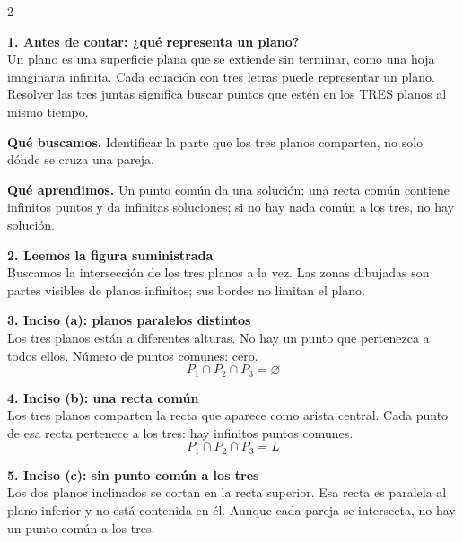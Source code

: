 \documentclass[11pt,a4paper,landscape]{article}
\begin{document}
\begin{multicols*}{2}
\noindent\begin{minipage}{\linewidth}\textbf{1. Antes de contar: ¿qué representa un plano?}\\[2pt]Un plano es una superficie plana que se extiende sin terminar, como una hoja imaginaria infinita. Cada ecuación con tres letras puede representar un plano. Resolver las tres juntas significa buscar puntos que estén en los TRES planos al mismo tiempo.
\par\smallskip\textbf{Qué buscamos.} Identificar la parte que los tres planos comparten, no solo dónde se cruza una pareja.
\par\smallskip\textbf{Qué aprendimos.} Un punto común da una solución; una recta común contiene infinitos puntos y da infinitas soluciones; si no hay nada común a los tres, no hay solución.
\end{minipage}\par\medskip
\noindent\begin{minipage}{\linewidth}\textbf{2. Leemos la figura suministrada}\\[2pt]Buscamos la intersección de los tres planos a la vez. Las zonas dibujadas son partes visibles de planos infinitos; sus bordes no limitan el plano.
\end{minipage}\par\medskip
\noindent\begin{minipage}{\linewidth}\textbf{3. Inciso (a): planos paralelos distintos}\\[2pt]Los tres planos están a diferentes alturas. No hay un punto que pertenezca a todos ellos. Número de puntos comunes: cero.
\[P_1\cap P_2\cap P_3=\varnothing\]
\end{minipage}\par\medskip
\noindent\begin{minipage}{\linewidth}\textbf{4. Inciso (b): una recta común}\\[2pt]Los tres planos comparten la recta que aparece como arista central. Cada punto de esa recta pertenece a los tres: hay infinitos puntos comunes.
\[P_1\cap P_2\cap P_3=L\]
\end{minipage}\par\medskip
\noindent\begin{minipage}{\linewidth}\textbf{5. Inciso (c): sin punto común a los tres}\\[2pt]Los dos planos inclinados se cortan en la recta superior. Esa recta es paralela al plano inferior y no está contenida en él. Aunque cada pareja se intersecta, no hay un punto común a los tres.

\end{minipage}
\end{multicols*}
\end{document}
